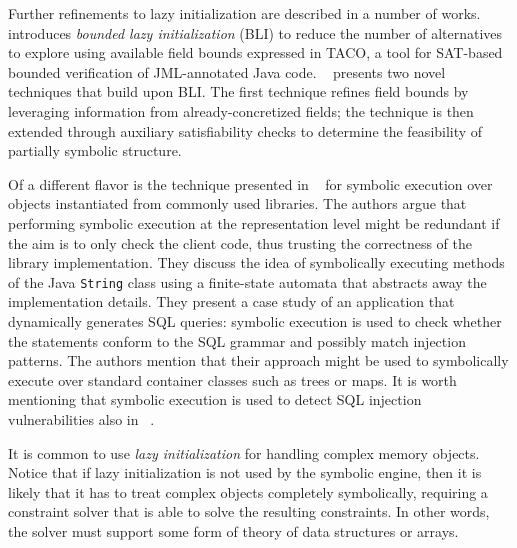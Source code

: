 Further refinements to lazy initialization are described in a number of works. \cite{BLI-NFM13} introduces {\em bounded lazy initialization} (BLI) to reduce the number of alternatives to explore using available field bounds expressed in TACO, a tool for SAT-based bounded verification of JML-annotated Java code. ~\cite{BLISS-TSE15} presents two novel techniques that build upon BLI. The first technique refines field bounds by leveraging information from already-concretized fields; the technique is then extended through auxiliary satisfiability checks to determine the feasibility of partially symbolic structure.

Of a different flavor is the technique presented in ~\cite{SHZ-TAIC07} for symbolic execution over objects instantiated from commonly used libraries. The authors argue that performing symbolic execution at the representation level might be redundant if the aim is to only check the client code, thus trusting the correctness of the library implementation. They discuss the idea of symbolically executing methods of the Java {\tt String} class using a finite-state automata that abstracts away the implementation details. They present a case study of an application that dynamically generates SQL queries: symbolic execution is used to check whether the statements conform to the SQL grammar and possibly match injection patterns. The authors mention that their approach might be used to symbolically execute over standard container classes such as trees or maps. It is worth mentioning that symbolic execution is used to detect SQL injection vulnerabilities also in ~\cite{FLP-COMPSAC07}.

\vspace{2em}

\iffalse
It is common to use {\em lazy initialization} for handling complex memory objects. Notice that if lazy initialization is not used by the symbolic engine, then it is likely that it has to treat complex objects completely symbolically, requiring a constraint solver that is able to solve the resulting constraints. In other words, the solver must support some form of theory of data structures or arrays.

